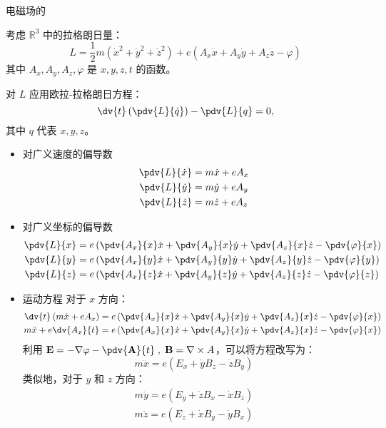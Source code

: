\documentclass[12pt, a4paper, oneside, UTF8]{ctexbook}  %
\begin{document}
\begin{example}
电磁场的
    
    考虑 \(\mathbb{R}^3\) 中的拉格朗日量：
    \[
    L = \frac{1}{2} m (\dot{x}^2 + \dot{y}^2 + \dot{z}^2) + e (A_x \dot{x} + A_y \dot{y} + A_z \dot{z} - \varphi)
    \]
    其中 \( A_x, A_y, A_z, \varphi \) 是 \( x, y, z, t \) 的函数。
    \begin{solution}
对 \( L \) 应用欧拉-拉格朗日方程：
\[
\dv{t} \left( \pdv{L}{\dot{q}} \right) - \pdv{L}{q} = 0,
\]
其中 \( q \) 代表 \( x, y, z \)。
\begin{itemize}
    \item 对广义速度的偏导数
\begin{align*}
\pdv{L}{\dot{x}} &= m \dot{x} + e A_x \\
\pdv{L}{\dot{y}} &= m \dot{y} + e A_y \\
\pdv{L}{\dot{z}} &= m \dot{z} + e A_z
\end{align*}
\item 对广义坐标的偏导数
\begin{align*}
\pdv{L}{x} &= e \left( \pdv{A_x}{x} \dot{x} + \pdv{A_y}{x} \dot{y} + \pdv{A_z}{x} \dot{z} - \pdv{\varphi}{x} \right) \\
\pdv{L}{y} &= e \left( \pdv{A_x}{y} \dot{x} + \pdv{A_y}{y} \dot{y} + \pdv{A_z}{y} \dot{z} - \pdv{\varphi}{y} \right) \\
\pdv{L}{z} &= e \left( \pdv{A_x}{z} \dot{x} + \pdv{A_y}{z} \dot{y} + \pdv{A_z}{z} \dot{z} - \pdv{\varphi}{z} \right)
\end{align*}
\item 运动方程
对于 \( x \) 方向：
\begin{align*}
\dv{t} \left( m \dot{x} + e A_x \right) &= e \left( \pdv{A_x}{x} \dot{x} + \pdv{A_y}{x} \dot{y} + \pdv{A_z}{x} \dot{z} - \pdv{\varphi}{x} \right) \\
m \ddot{x} + e \dv{A_x}{t} &= e \left( \pdv{A_x}{x} \dot{x} + \pdv{A_y}{x} \dot{y} + \pdv{A_z}{x} \dot{z} - \pdv{\varphi}{x} \right)
\end{align*}
利用 \(\displaystyle \mathbf{E} = -\nabla \varphi - \pdv{\mathbf{A}}{t}
\;,\; \mathbf{B}=\nabla\times A \)，可以将方程改写为：
\[
m \ddot{x} = e \left( E_x + \dot{y} B_z - \dot{z} B_y \right)
\]
类似地，对于 \( y \) 和 \( z \) 方向：
\begin{gather*}
    m \ddot{y} = e \left( E_y + \dot{z} B_x - \dot{x} B_z \right)
    \\
    m \ddot{z} = e \left( E_z + \dot{x} B_y - \dot{y} B_x \right)
\end{gather*}
\end{itemize}
    \end{solution} 
\end{example}
\end{document}
